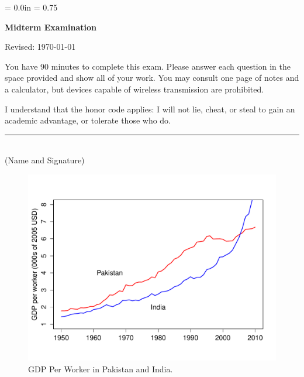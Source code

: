 \documentclass[letterpaper,12pt]{exam}
\def\HeadName{Midterm Examination}
\begin{document}
\parindent = 0.0in
\parskip = 0.75\bigskipamount
\thispagestyle{empty}%
\Head

\centerline{\large \bf \HeadName}%
\centerline{Revised:  \today}

\bigskip
You have 90 minutes to complete this exam.  Please answer each
question in the space provided and show all of your work.
You may consult one page of notes and a calculator,
but devices capable of wireless transmission are prohibited.

I understand that the honor code applies: I will not lie, cheat,
or steal to gain an academic advantage, or tolerate those who do.

\begin{flushright}
\rule{4in}{0.5pt} \\ (Name and Signature)
\end{flushright}

\begin{figure}[h]
    \centering
    \includegraphics[scale=0.6]{PAKIND_s13_YL.pdf}
    \caption{GDP Per Worker in Pakistan and India.}
    \label{fig:pakistan}
\end{figure}
\end{document}
